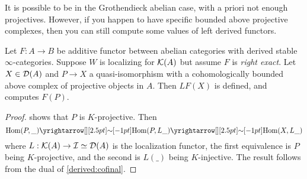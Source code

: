 \documentclass{article}
\begin{document}
It is possible to be in the Grothendieck abelian case,
with a priori not enough projectives.
However, if you happen to have specific bounded above
projective complexes, then you can still compute some values of 
left derived functors.
\begin{prop}
  
  Let $F : A \to B$ be additive functor between abelian categories
  with derived stable $\infty$-categories.
  Suppose $W$ is localizing for $\mathcal{K}(A)$ but assume $F$ is \emph{right exact}.
  Let $X \in \mathcal{D}(A)$ and $P \to X$ a quasi-isomorphism
  with a cohomologically bounded above complex of projective objects in $A$.
  Then $LF(X)$ is defined, and computes $F(P)$.
\end{prop}
\begin{proof}
  \cite[Lem. 1.3.2.20]{lurie-HA} shows that $P$ is $K$-projective.
  Then \[
    \HOM(P , \_) \map{\sim}{} \HOM(P , L \_) \map{\sim}{} \HOM(X , L \_)
  \]
  where $L : \mathcal{K}(A) \to \mathcal{I} \simeq \mathcal{D}(A)$ is the localization functor,
  the first equivalence is $P$ being $K$-projective,
  and the second is $L(\_)$ being $K$-injective.
  The result follows from the dual of \ref{derived:cofinal}.
\end{proof}
\end{document}
